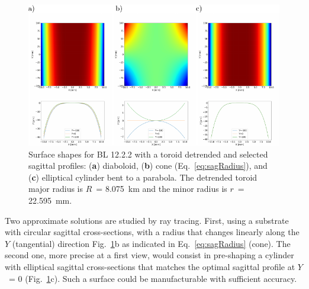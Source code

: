 \documentclass{iucr}       %
\begin{document}
\begin{figure}\label{fig:detrendedBeamline}
\includegraphics[width=1.0\textwidth]{figures/fig8.pdf}
% 

\caption{Surface shapes for BL 12.2.2 with a toroid detrended and selected sagittal profiles: (\textbf{a}) diaboloid, (\textbf{b}) cone (Eq.~\ref{eq:sagRadius}), and (\textbf{c}) elliptical cylinder bent to a parabola. The detrended toroid major radius is $R$~= \SI{8.075}{\kilo\meter} and the minor radius is $r$~= \SI{22.595}{\milli\meter}.}
\end{figure}

Two approximate solutions are studied by ray tracing. First, using a substrate with circular sagittal cross-sections, with a radius that changes linearly along the $Y$ (tangential) direction Fig.~\ref{fig:detrendedBeamline}b as indicated in Eq.~\ref{eq:sagRadius} (cone). The second one, more precise at a first view, would consist in pre-shaping a cylinder with elliptical sagittal cross-sections that matches the optimal sagittal profile at $Y$~= 0 (Fig.~\ref{fig:detrendedBeamline}c). Such a surface could be manufacturable with sufficient accuracy.
\end{document}
